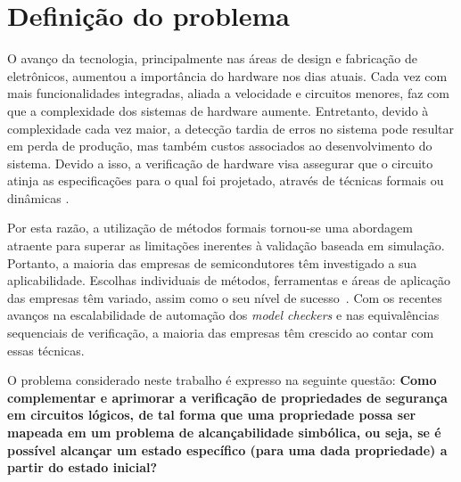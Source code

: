 \section{Definição do problema}

O avanço da tecnologia, principalmente nas áreas de design e fabricação de eletrônicos, aumentou a importância do hardware nos dias atuais. Cada vez com mais funcionalidades integradas, aliada a velocidade e circuitos menores, faz com que a complexidade dos sistemas de hardware aumente. Entretanto, devido à complexidade cada vez maior, a detecção tardia de erros no sistema pode resultar em perda de produção, mas também custos associados ao desenvolvimento do sistema\cite{gupta1992formal}. Devido a isso, a verificação de hardware visa assegurar que o circuito atinja as especificações para o qual foi projetado, através de técnicas formais ou dinâmicas \cite{boule2007efficient}.


Por esta razão, a utilização de métodos formais tornou-se uma abordagem atraente para superar as limitações inerentes à validação baseada em simulação. Portanto, a maioria das empresas de semicondutores têm investigado a sua aplicabilidade. Escolhas individuais de métodos, ferramentas e áreas de aplicação das empresas têm variado, assim como o seu nível de sucesso~\cite{cabodi2016hardware}. Com os recentes avanços na escalabilidade de automação dos \textit{model checkers} e nas equivalências sequenciais de verificação, a maioria das empresas têm crescido ao contar com essas técnicas\cite{clarke2008birth}.

O problema considerado neste trabalho é expresso na seguinte questão: \textbf{Como complementar e aprimorar a verificação de propriedades de segurança em circuitos lógicos, de tal forma que uma propriedade possa ser mapeada em um problema de alcançabilidade simbólica, ou seja, se é possível alcançar um estado específico (para uma dada propriedade) a partir do estado inicial?}

